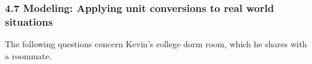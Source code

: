 

\fancyhead[LE]{\thepage}



\subsubsection*{4.7 Modeling: Applying unit conversions to real world situations}

The following questions concern Kevin’s college dorm room, which he shares with a roommate.

